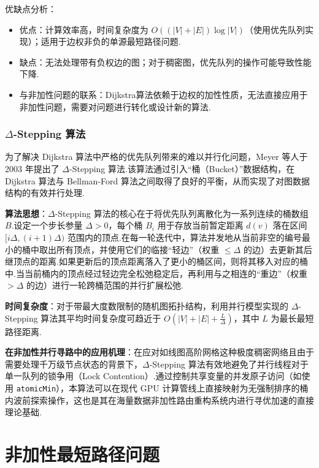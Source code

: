 优缺点分析：
\begin{itemize}
  \item 优点：计算效率高，时间复杂度为 $O((|V|+|E|)\log|V|)$（使用优先队列实现）；适用于边权非负的单源最短路径问题.
  \item 缺点：无法处理带有负权边的图；对于稠密图，优先队列的操作可能导致性能下降.
  \item 与非加性问题的联系：Dijkstra算法依赖于边权的加性性质，无法直接应用于非加性问题，需要对问题进行转化或设计新的算法.
\end{itemize}

\subsubsection{\texorpdfstring{$\Delta$}{Delta}-Stepping 算法}

为了解决 Dijkstra 算法中严格的优先队列带来的难以并行化问题，Meyer 等人于 2003 年提出了 $\Delta$-Stepping 算法.该算法通过引入“桶（Bucket）”数据结构，在 Dijkstra 算法与 Bellman-Ford 算法之间取得了良好的平衡，从而实现了对图数据结构的有效并行处理.

\textbf{算法思想}：$\Delta$-Stepping 算法的核心在于将优先队列离散化为一系列连续的桶数组 $B$.设定一个步长参量 $\Delta > 0$，每个桶 $B_i$ 用于存放当前暂定距离 $d(v)$ 落在区间 $[i\Delta, (i+1)\Delta)$ 范围内的顶点.在每一轮迭代中，算法并发地从当前非空的编号最小的桶中取出所有顶点，并使用它们的临接“轻边”（权重 $\le \Delta$ 的边）去更新其后继顶点的距离.如果更新后的顶点距离落入了更小的桶区间，则将其移入对应的桶中.当当前桶内的顶点经过轻边完全松弛稳定后，再利用与之相连的“重边”（权重 $> \Delta$ 的边）进行一轮跨桶范围的并行扩展松弛.

\textbf{时间复杂度}：对于带最大度数限制的随机图拓扑结构，利用并行模型实现的 $\Delta$-Stepping 算法其平均时间复杂度可趋近于 $O(|V| + |E| + \frac{L}{\Delta})$，其中 $L$ 为最长最短路径距离.

\textbf{在非加性并行寻路中的应用机理}：在应对如线图高阶网格这种极度稠密网络且由于需要处理千万级节点状态的背景下，$\Delta$-Stepping 算法有效地避免了并行线程对于单一队列的锁争用（Lock Contention）.通过控制共享变量的并发原子访问（如使用 \texttt{atomicMin}），本算法可以在现代 GPU 计算管线上直接映射为无强制排序的桶内波前探索操作，这也是其在海量数据非加性路由重构系统内进行寻优加速的直接理论基础.

\section{非加性最短路径问题}

